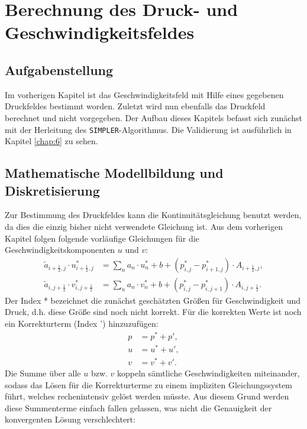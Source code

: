 \chapter{Berechnung des Druck- und Geschwindigkeitsfeldes}

\section{Aufgabenstellung}
Im vorherigen Kapitel ist das Geschwindigkeitsfeld mit Hilfe eines gegebenen Druckfeldes bestimmt worden. Zuletzt wird nun ebenfalls das Druckfeld berechnet und nicht vorgegeben. Der Aufbau dieses Kapitels befasst sich zun\"achst mit der Herleitung des \texttt{SIMPLER}-Algorithmus. Die Validierung ist ausf\"uhrlich in Kapitel \ref{chap:6} zu sehen.


\section{Mathematische Modellbildung und Diskretisierung}
Zur Bestimmung des Druckfeldes kann die Kontinuit\"atsgleichung benutzt werden, da dies die einzig bisher nicht verwendete Gleichung ist. Aus dem vorherigen Kapitel folgen folgende vorl\"aufige Gleichungen f\"ur die Geschwindigkeitskomponenten $u$ und $v$:
\begin{align}
\tilde{a}_{i+\frac{1}{2},j}\cdot u_{i+\frac{1}{2},j}^{*}&=\sum\limits_{n}a_{n}\cdot u_{n}^{*} + b + \left(p_{i,j}^{*}-p_{i+1,j}^{*}\right)\cdot A_{i+\frac{1}{2},j}, \\
\tilde{a}_{i,j+\frac{1}{2}}\cdot v_{i,j+\frac{1}{2}}^{*}&=\sum\limits_{n}a_{n}\cdot v_{n}^{*} + b + \left(p_{i,j}^{*}-p_{i,j+1}^{*}\right)\cdot A_{i,j+\frac{1}{2}}.
\end{align}
Der Index * bezeichnet die zun\"achst gesch\"atzten Gr\"o\ss{}en f\"ur Geschwindigkeit und Druck, d.h. diese Gr\"o\ss{}e sind noch nicht korrekt. F\"ur die korrekten Werte ist noch ein Korrekturterm (Index ') hinzuzuf\"ugen:
\begin{align}
p&=p^{*}+p', \\
u&=u^{*}+u', \\
v&=v^{*}+v'.
\end{align}
Die Summe \"uber alle $u$ bzw. $v$ koppeln s\"amtliche Geschwindigkeiten miteinander, sodass das L\"osen f\"ur die Korrekturterme zu einem impliziten Gleichungssystem f\"uhrt, welches rechenintensiv gel\"ost werden m\"usste. Aus diesem Grund werden diese Summenterme einfach fallen gelassen, was nicht die Genauigkeit der konvergenten L\"osung verschlechtert:
